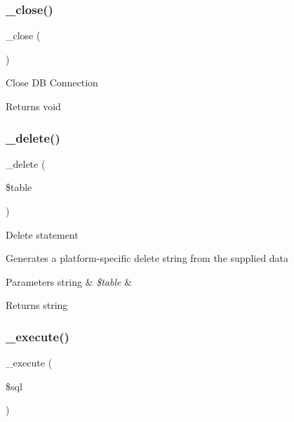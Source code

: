 \subsubsection{\texorpdfstring{\+\_\+close()}{\_close()}}
{\footnotesize\ttfamily \+\_\+close (\begin{DoxyParamCaption}{ }\end{DoxyParamCaption})\hspace{0.3cm}{\ttfamily [protected]}}

Close DB Connection

\begin{DoxyReturn}{Returns}
void 
\end{DoxyReturn}
\mbox{\label{class_c_i___d_b__sqlsrv__driver_a133ea8446ded52589bd22cc9163d0896}} 
\subsubsection{\texorpdfstring{\+\_\+delete()}{\_delete()}}
{\footnotesize\ttfamily \+\_\+delete (\begin{DoxyParamCaption}\item[{}]{\$table }\end{DoxyParamCaption})\hspace{0.3cm}{\ttfamily [protected]}}

Delete statement

Generates a platform-\/specific delete string from the supplied data


\begin{DoxyParams}[1]{Parameters}
string & {\em \$table} & \\
\hline
\end{DoxyParams}
\begin{DoxyReturn}{Returns}
string 
\end{DoxyReturn}
\mbox{\label{class_c_i___d_b__sqlsrv__driver_a114ab675d89bf8324a41785fb475e86d}} 
\subsubsection{\texorpdfstring{\+\_\+execute()}{\_execute()}}
{\footnotesize\ttfamily \+\_\+execute (\begin{DoxyParamCaption}\item[{}]{\$sql }\end{DoxyParamCaption})\hspace{0.3cm}{\ttfamily [protected]}}

